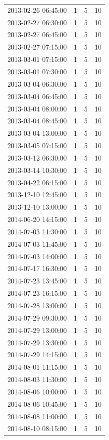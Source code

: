 \begin{tabular}{lrrr}
2013-02-26 06:45:00 & 1 & 5 & 10 \\
2013-02-27 06:30:00 & 1 & 5 & 10 \\
2013-02-27 06:45:00 & 1 & 5 & 10 \\
2013-02-27 07:15:00 & 1 & 5 & 10 \\
2013-03-01 07:15:00 & 1 & 5 & 10 \\
2013-03-01 07:30:00 & 1 & 5 & 10 \\
2013-03-04 06:30:00 & 1 & 5 & 10 \\
2013-03-04 06:45:00 & 1 & 5 & 10 \\
2013-03-04 08:00:00 & 1 & 5 & 10 \\
2013-03-04 08:45:00 & 1 & 5 & 10 \\
2013-03-04 13:00:00 & 1 & 5 & 10 \\
2013-03-05 07:15:00 & 1 & 5 & 10 \\
2013-03-12 06:30:00 & 1 & 5 & 10 \\
2013-03-14 10:30:00 & 1 & 5 & 10 \\
2013-04-22 06:15:00 & 1 & 5 & 10 \\
2013-12-10 12:45:00 & 1 & 5 & 10 \\
2013-12-10 13:00:00 & 1 & 5 & 10 \\
2014-06-20 14:15:00 & 1 & 5 & 10 \\
2014-07-03 11:30:00 & 1 & 5 & 10 \\
2014-07-03 11:45:00 & 1 & 5 & 10 \\
2014-07-03 14:00:00 & 1 & 5 & 10 \\
2014-07-17 16:30:00 & 1 & 5 & 10 \\
2014-07-23 13:45:00 & 1 & 5 & 10 \\
2014-07-23 16:15:00 & 1 & 5 & 10 \\
2014-07-28 13:00:00 & 1 & 5 & 10 \\
2014-07-29 09:30:00 & 1 & 5 & 10 \\
2014-07-29 13:00:00 & 1 & 5 & 10 \\
2014-07-29 13:30:00 & 1 & 5 & 10 \\
2014-07-29 14:15:00 & 1 & 5 & 10 \\
2014-08-01 11:15:00 & 1 & 5 & 10 \\
2014-08-03 11:30:00 & 1 & 5 & 10 \\
2014-08-06 10:00:00 & 1 & 5 & 10 \\
2014-08-06 10:45:00 & 1 & 5 & 10 \\
2014-08-08 11:00:00 & 1 & 5 & 10 \\
2014-08-10 08:15:00 & 1 & 5 & 10 \\

\end{tabular}
